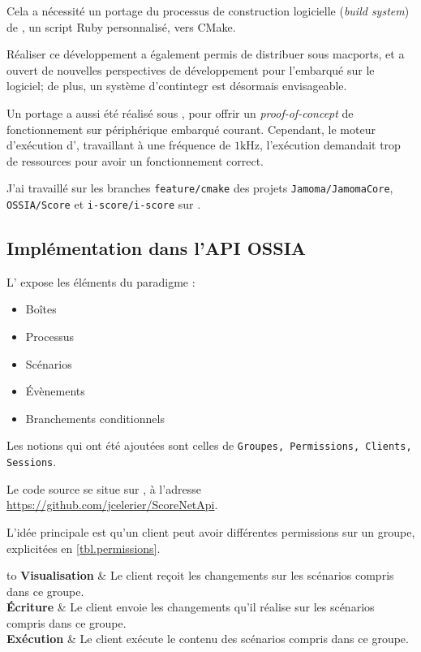 Cela a nécessité un portage du processus de construction logicielle (\textit{build system})  de , un script Ruby personnalisé, vers \gls{CMake}.

Réaliser ce développement a également permis de distribuer  sous \gls{macports}, et a ouvert de nouvelles perspectives de développement pour l'embarqué sur le logiciel; de plus, un système d'\gls{contintegr} est désormais envisageable.

Un portage a aussi été réalisé sous , pour offrir un \textit{proof-of-concept} de fonctionnement sur périphérique embarqué courant. Cependant, le moteur d'exécution d', travaillant à une fréquence de $\num{1} \si{\kHz}$, l'exécution demandait trop de ressources pour avoir un fonctionnement correct.

J'ai travaillé sur les branches \texttt{feature/cmake} des projets \texttt{Jamoma/JamomaCore}, \texttt{OSSIA/Score} et \texttt{i-score/i-score} sur .
\subsection{Implémentation dans l'API OSSIA}
L' expose les éléments du paradigme  : 

\begin{itemize}
	\item Boîtes
	\item Processus
	\item Scénarios
	\item Évènements
	\item Branchements conditionnels
\end{itemize}

Les notions qui ont été ajoutées sont celles de \texttt{Groupes, Permissions, Clients, Sessions}.

Le code source se situe sur , à l'adresse \url{https://github.com/jcelerier/ScoreNetApi}.

L'idée principale est qu'un client peut avoir différentes permissions sur un groupe, explicitées en \cref{tbl.permissions}.

\begin{table}[H]
	\centering
	
	\begin{tabu} to \linewidth{XX[4,m]}
		\textbf{Visualisation} & Le client reçoit les changements sur les scénarios compris dans ce groupe. \\ \midrule
		\textbf{Écriture} & Le client envoie les changements qu'il réalise sur les scénarios compris dans ce groupe. \\ \midrule 
		\textbf{Exécution} & Le client exécute le contenu des scénarios compris dans ce groupe. \\
	\end{tabu}
	
	\caption{Explication des permissions possibles}
	\label{tbl.permissions}
\end{table}

